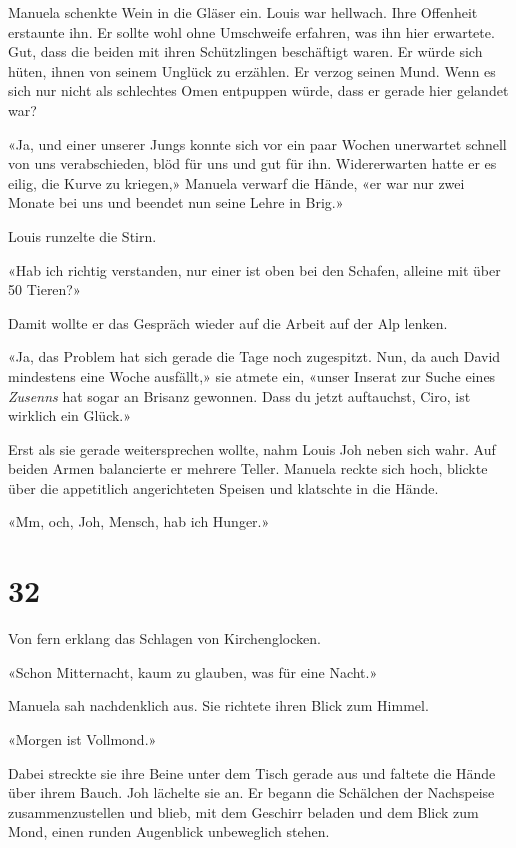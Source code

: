 Manuela schenkte Wein in die Gläser ein. Louis war hellwach. Ihre
Offenheit erstaunte ihn. Er sollte wohl ohne Umschweife erfahren, was
ihn hier erwartete. Gut, dass die beiden mit ihren Schützlingen
beschäftigt waren. Er würde sich hüten, ihnen von seinem Unglück zu
erzählen. Er verzog seinen Mund. Wenn es sich nur nicht als schlechtes
Omen entpuppen würde, dass er gerade hier gelandet war?

«Ja, und einer unserer Jungs konnte sich vor ein paar Wochen unerwartet
schnell von uns verabschieden, blöd für uns und gut für ihn.
Widererwarten hatte er es eilig, die Kurve zu kriegen,» Manuela verwarf
die Hände, «er war nur zwei Monate bei uns und beendet nun seine Lehre
in Brig.»

Louis runzelte die Stirn.

«Hab ich richtig verstanden, nur einer ist oben bei den Schafen, alleine
mit über 50 Tieren?»

Damit wollte er das Gespräch wieder auf die Arbeit auf der Alp lenken.

«Ja, das Problem hat sich gerade die Tage noch zugespitzt. Nun, da auch
David mindestens eine Woche ausfällt,» sie atmete ein, «unser Inserat
zur Suche eines \emph{Zusenns} hat sogar an Brisanz gewonnen. Dass du
jetzt auftauchst, Ciro, ist wirklich ein Glück.»

Erst als sie gerade weitersprechen wollte, nahm Louis Joh neben sich
wahr. Auf beiden Armen balancierte er mehrere Teller. Manuela reckte
sich hoch, blickte über die appetitlich angerichteten Speisen und
klatschte in die Hände.

«Mm, och, Joh, Mensch, hab ich Hunger.»

\chapter{32}\label{section-31}

Von fern erklang das Schlagen von Kirchenglocken.

«Schon Mitternacht, kaum zu glauben, was für eine Nacht.»

Manuela sah nachdenklich aus. Sie richtete ihren Blick zum Himmel.

«Morgen ist Vollmond.»

Dabei streckte sie ihre Beine unter dem Tisch gerade aus und faltete die
Hände über ihrem Bauch. Joh lächelte sie an. Er begann die Schälchen der
Nachspeise zusammenzustellen und blieb, mit dem Geschirr beladen und dem
Blick zum Mond, einen runden Augenblick unbeweglich stehen.

